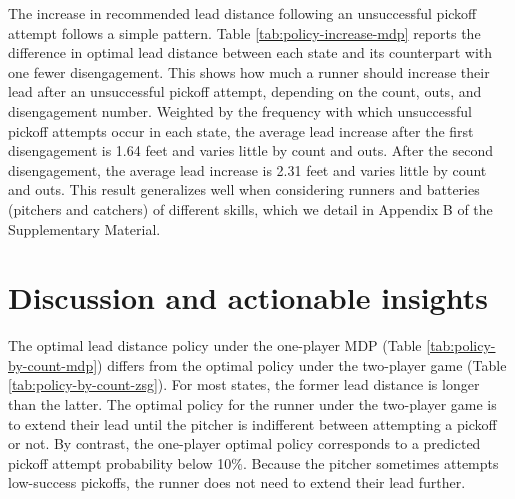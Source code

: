 \documentclass[aoas]{imsart}
\newcommand{\tablepath}{../../output/tables/}
\newcommand{\inputtable}[1]{}
\begin{document}
      The increase in recommended lead distance following an unsuccessful pickoff attempt follows a simple pattern. Table \ref{tab:policy-increase-mdp} reports the difference in optimal lead distance between each state and its counterpart with one fewer disengagement. This shows how much a runner should increase their lead after an unsuccessful pickoff attempt, depending on the count, outs, and disengagement number. Weighted by the frequency with which unsuccessful pickoff attempts occur in each state, the average lead increase after the first disengagement is 1.64 feet and varies little by count and outs. After the second disengagement, the average lead increase is 2.31 feet and varies little by count and outs. This result generalizes well when considering runners and batteries (pitchers and catchers) of different skills, which we detail in Appendix B of the Supplementary Material.
      
      \begin{table}
        \small
        \centering
        \inputtable{policy_increase_mdp.tex}
        \caption{
          \it The increase in optimal lead distance (in feet) after an unsuccessful pickoff attempt under the one-player MDP, assuming an average runner on first base facing an average battery (pitcher and catcher) with third base empty. Estimates include standard errors estimated via bootstrapping.
        }
        \label{tab:policy-increase-mdp}
      \end{table}

  \section{Discussion and actionable insights}
  \label{sec:discussion}

    The optimal lead distance policy under the one-player MDP (Table \ref{tab:policy-by-count-mdp}) differs from the optimal policy under the two-player game (Table \ref{tab:policy-by-count-zsg}). For most states, the former lead distance is longer than the latter. The optimal policy for the runner under the two-player game is to extend their lead until the pitcher is indifferent between attempting a pickoff or not. By contrast, the one-player optimal policy corresponds to a predicted pickoff attempt probability below 10\%. Because the pitcher sometimes attempts low-success pickoffs, the runner does not need to extend their lead further.
\end{document}
